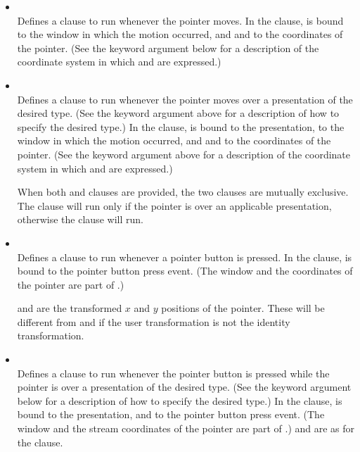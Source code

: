\begin{itemize}
\item { } \\
Defines a clause to run whenever the pointer moves.  In the clause, 
is bound to the window in which the motion occurred, and  and  to
the coordinates of the pointer. (See the keyword argument  below
for a description of the coordinate system in which  and  are
expressed.)

\item { } \\
Defines a clause to run whenever the pointer moves over a presentation of the
desired type.  (See the keyword argument  above for a
description of how to specify the desired type.)  In the clause,
 is bound to the presentation,  to the window in
which the motion occurred, and  and  to the coordinates of the
pointer.  (See the keyword argument  above for a description of
the coordinate system in which  and  are expressed.)

When both  and  clauses are provided, the
two clauses are mutually exclusive.  The  clause will run only
if the pointer is over an applicable presentation, otherwise the
 clause will run.

\item { } \\
Defines a clause to run whenever a pointer button is pressed. In the clause,
 is bound to the pointer button press event. (The window and the
coordinates of the pointer are part of .)

 and  are the transformed $x$ and $y$ positions of the pointer.
These will be different from  and  if
the user transformation is not the identity transformation.

\item { } \\
Defines a clause to run whenever the pointer button is pressed while the pointer
is over a presentation of the desired type. (See the keyword argument
 below for a description of how to specify the desired type.)
In the clause,  is bound to the presentation, and 
to the pointer button press event.  (The window and the stream coordinates of
the pointer are part of .)   and  are as for the
 clause.


\end{itemize}

